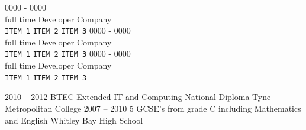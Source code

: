 \documentclass[9pt]{cv}
\begin{document}


\begin{entrylist}
	\entry
		{0000 - 0000\\\footnotesize{full time}}
		{Developer}
		{Company}
		{\lorem\\
		\texttt{ITEM 1}\slashsep
		\texttt{ITEM 2}\slashsep
		\texttt{ITEM 3}}
	\entry
		{0000 - 0000\\\footnotesize{full time}}
		{Developer}
		{Company}
		{\lorem\\
		\texttt{ITEM 1}\slashsep
		\texttt{ITEM 2}\slashsep
		\texttt{ITEM 3}}
	\entry
		{0000 - 0000\\\footnotesize{full time}}
		{Developer}
		{Company}
		{\lorem\\
		\texttt{ITEM 1}\slashsep
		\texttt{ITEM 2}\slashsep
		\texttt{ITEM 3}}
\end{entrylist}



\begin{entrylist}
	\entry
		{2010 -- 2012}
		{BTEC Extended IT and Computing National Diploma}
		{Tyne Metropolitan College}
		{}
	\entry
		{2007 -- 2010}
		{5 GCSE's from grade C including Mathematics and English}
		{Whitley Bay High School}
		{}
\end{entrylist}


\begin{minipage}[t]{0.3\textwidth}
	\vspace{-\baselineskip}

	
	\lorem
\end{minipage}
\hfill
\begin{minipage}[t]{0.3\textwidth}
	\vspace{-\baselineskip}
	
	
	\lorem
\end{minipage}
\hfill
\begin{minipage}[t]{0.3\textwidth}
	\vspace{-\baselineskip}
	

	\lorem
\end{minipage}

\end{document}
